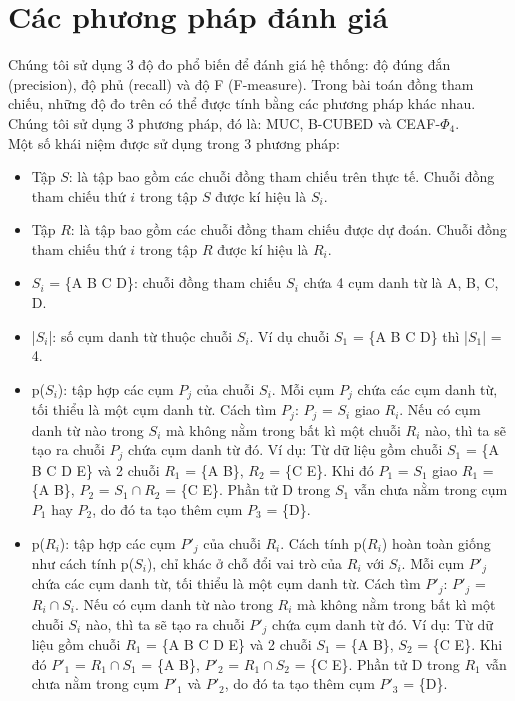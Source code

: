 \documentclass[12pt]{report}
\begin{document}
		\section{Các phương pháp đánh giá}			
				\par Chúng tôi sử dụng 3 độ đo phổ biến để đánh giá hệ thống: độ đúng đắn (precision), độ phủ (recall) và độ F (F-measure). Trong bài toán đồng tham chiếu, những độ đo trên có thể được tính bằng các phương pháp khác nhau. Chúng tôi sử dụng 3 phương pháp, đó là: MUC, B-CUBED và CEAF-$\Phi_4$.
				\\Một số khái niệm được sử dụng trong 3 phương pháp:
					\begin{itemize}
						\item{Tập $S$: là tập bao gồm các chuỗi đồng tham chiếu trên thực tế. Chuỗi đồng tham chiếu thứ $i$ trong tập $S$ được kí hiệu là $S_i$.}
						\item{Tập $R$: là tập bao gồm các chuỗi đồng tham chiếu được dự đoán. Chuỗi đồng tham chiếu thứ $i$ trong tập $R$ được kí hiệu là $R_i$.}
						\item{$S_i$ = \{A B C D\}: chuỗi đồng tham chiếu $S_i$ chứa 4 cụm danh từ là A, B, C, D.}
						\item{|$S_i$|: số cụm danh từ thuộc chuỗi $S_i$. Ví dụ chuỗi $S_1$ = \{A B C D\} thì |$S_1$| = 4.}
						\item{p($S_i$): tập hợp các cụm $P_j$ của chuỗi $S_i$. Mỗi cụm $P_j$ chứa các cụm danh từ, tối thiểu là một cụm danh từ. Cách tìm $P_j$: $P_j$ = $S_i$ giao $R_i$. Nếu có cụm danh từ nào trong $S_i$ mà không nằm trong bất kì một chuỗi $R_i$ nào, thì ta sẽ tạo ra chuỗi $P_j$ chứa cụm danh từ đó. Ví dụ: Từ dữ liệu gồm chuỗi $S_1$ = \{A B C D E\} và 2 chuỗi $R_1$ = \{A B\}, $R_2$ = \{C E\}. Khi đó $P_1$ = $S_1$ giao $R_1$ = \{A B\}, $P_2$ = $S_1 \cap R_2$ = \{C E\}. Phần tử D trong $S_1$ vẫn chưa nằm trong cụm $P_1$ hay $P_2$, do đó ta tạo thêm cụm $P_3$ = \{D\}.}							
						\item p($R_i$): tập hợp các cụm $P'_j$ của chuỗi $R_i$. Cách tính p($R_i$) hoàn toàn giống như cách tính p($S_i$), chỉ khác ở chỗ đổi vai trò của $R_i$ với $S_i$. Mỗi cụm $P'_j$ chứa các cụm danh từ, tối thiểu là một cụm danh từ. Cách tìm $P'_j$: $P'_j$ = $R_i \cap S_i$. Nếu có cụm danh từ nào trong $R_i$ mà không nằm trong bất kì một chuỗi $S_i$ nào, thì ta sẽ tạo ra chuỗi $P'_j$ chứa cụm danh từ đó. Ví dụ: Từ dữ liệu gồm chuỗi $R_1$ = \{A B C D E\} và 2  chuỗi $S_1$ = \{A B\}, $S_2$ = \{C E\}. Khi đó $P'_1$ = $R_1 \cap S_1$ = \{A B\}, $P'_2$ = $R_1 \cap S_2$ = \{C E\}. Phần tử D trong $R_1$ vẫn chưa nằm trong cụm $P'_1$ và $P'_2$, do đó ta tạo thêm cụm $P'_3$ = \{D\}.
					\end{itemize}
\end{document}

